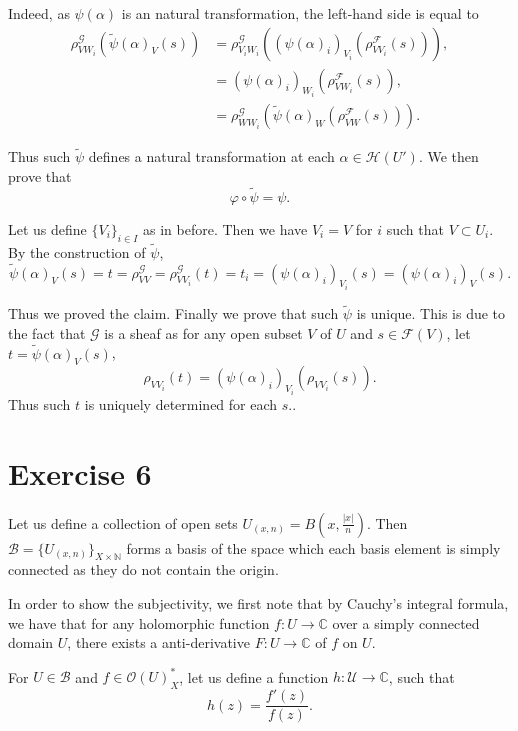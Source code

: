 \documentclass{article}
\begin{document}
Indeed, as $\psi(\alpha)$ is an natural transformation, the left-hand side is equal to
\begin{align*}
\rho_{VW_i}^{\mathcal{G}}(\tilde{\psi}(\alpha)_V(s))&=\rho_{V_iW_i}^{\mathcal{G}}((\psi(\alpha)_i)_{V_i}(\rho^{\mathcal{F}}_{VV_i}(s))),\\
&=(\psi(\alpha)_i)_{W_i}(\rho^{\mathcal{F}}_{VW_i}(s)),\\
&=\rho^{\mathcal{G}}_{WW_i}(\tilde{\psi}(\alpha)_{W}(\rho^{\mathcal{F}}_{VW}(s))).
\end{align*}

Thus such $\tilde{\psi}$ defines a natural transformation at each $\alpha\in\mathcal{H}(U')$. We then prove that 
\begin{equation*}
\varphi\circ\tilde{\psi}=\psi.
\end{equation*}

Let us define $\{V_i\}_{i\in I}$ as in before. Then we have $V_i = V$ for $i$ such that $V\subset U_i$. By the construction of $\tilde{\psi}$,
\begin{equation*}
\tilde{\psi}(\alpha)_V(s) = t=\rho^{\mathcal{G}}_{VV}=\rho^{\mathcal{G}}_{VV_i}(t) = t_i = (\psi(\alpha)_i)_{V_i}(s)=(\psi(\alpha)_i)_{V}(s).
\end{equation*}

Thus we proved the claim. Finally we prove that such $\tilde{\psi}$ is unique. This is due to the fact that $\mathcal{G}$ is a sheaf as for any open subset $V$ of $U$ and $s\in\mathcal{F}(V)$, let $t=\tilde{\psi}(\alpha)_V(s)$, 
\begin{equation*}
\rho_{VV_i}(t) = (\psi(\alpha)_i)_{V_i}(\rho_{VV_i}(s)).
\end{equation*}
Thus such $t$ is uniquely determined for each $s$..

\section{Exercise 6}

Let us define a collection of open sets $U_{(x,n)} = B(x,{\frac {|x|} n})$. Then $\mathcal{B}=\{U_{(x,n)}\}_{X\times\mathbb{N}}$ forms a basis of the space which each basis element is simply connected as they do not contain the origin.\\

\par In order to show the subjectivity, we first note that by Cauchy's integral formula, we have that for any holomorphic function $f:U\to\mathbb{C}$ over a simply connected domain $U$, there exists a anti-derivative $F:U\to\mathbb{C}$ of $f$ on $U$. \\
\par For $U\in\mathcal{B}$ and $f\in\mathcal{O}(U)^*_X$, let us define a function $h:\mathcal{U}\to\mathbb{C}$, such that
\begin{equation*}
h(z) = {\frac {f'(z)} {f(z)}}.
\end{equation*}
\end{document}
